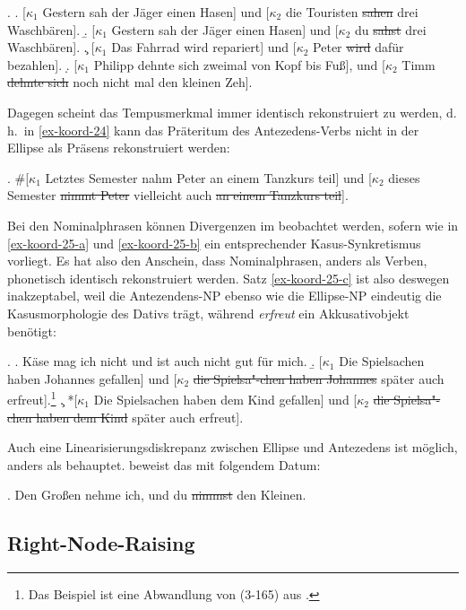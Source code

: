 \ex. 
\a. \label{ex-koord-23-a}[$\kappa_1$ Gestern sah der Jäger einen Hasen] und [$\kappa_2$ die Touristen \sout{sahen} drei Waschbären].
\b. \label{ex-koord-23-b}[$\kappa_1$ Gestern sah der Jäger einen Hasen] und [$\kappa_2$ du \sout{sahst} drei Waschbären]. 
\c. \label{ex-koord-23-c}[$\kappa_1$ Das Fahrrad wird repariert] und [$\kappa_2$ Peter \sout{wird} dafür bezahlen].
\d. \label{ex-koord-23-d}[$\kappa_1$ Philipp dehnte sich zweimal von Kopf bis Fuß], und [$\kappa_2$ Timm \sout{dehnte sich} noch nicht mal den kleinen Zeh].    

Dagegen scheint das Tempusmerkmal immer identisch rekonstruiert zu werden, d.\,h.\ in \ref{ex-koord-24} kann das Präteritum des Antezedens-Verbs nicht in der Ellipse als Präsens rekonstruiert werden:

\ex.  \#[$\kappa_1$ Letztes Semester nahm Peter an einem Tanzkurs teil] und [$\kappa_2$ dieses Semester \sout{nimmt Peter} vielleicht auch \sout{an einem Tanzkurs teil}].\label{ex-koord-24}

Bei den Nominalphrasen können Divergenzen im  beobachtet werden, sofern wie in \ref{ex-koord-25-a} und \ref{ex-koord-25-b} ein entsprechender Kasus-Synkretismus vorliegt. Es hat also den Anschein, dass Nominalphrasen, anders als Verben, phonetisch identisch rekonstruiert werden. Satz \ref{ex-koord-25-c} ist also deswegen inakzeptabel, weil die Antezendens-NP ebenso wie die Ellipse-NP eindeutig die Kasusmorphologie des Dativs trägt, während {\it erfreut} ein Akkusativobjekt benötigt:

\ex. \label{ex-koord-25}
\a. Käse mag ich nicht und ist auch nicht gut für mich. \hfill \citep[(36)]{Oirsouw:93}\label{ex-koord-25-a}
\b. [$\kappa_1$ Die Spielsachen haben Johannes gefallen] und [$\kappa_2$ \sout{die Spielsa"-chen haben Johannes} später auch erfreut].\footnote{Das Beispiel ist eine Abwandlung von (3-165) aus \cite{Hesse:Kuestner:85}. }\label{ex-koord-25-b} 
\c. *[$\kappa_1$ Die Spielsachen haben dem Kind gefallen] und [$\kappa_2$ \sout{die Spielsa"-chen haben dem Kind} später auch erfreut].\label{ex-koord-25-c} 

Auch eine Linearisierungsdiskrepanz zwischen Ellipse und Antezedens ist möglich, anders als \cite{Ross:70} behauptet. \cite{Oirsouw:87} beweist das mit folgendem Datum:

\ex. Den Gro\ss en nehme ich, und du \sout{nimmst} den Kleinen. \hfill \citep[262]{Oirsouw:87}



\subsection{Right-Node-Raising}


